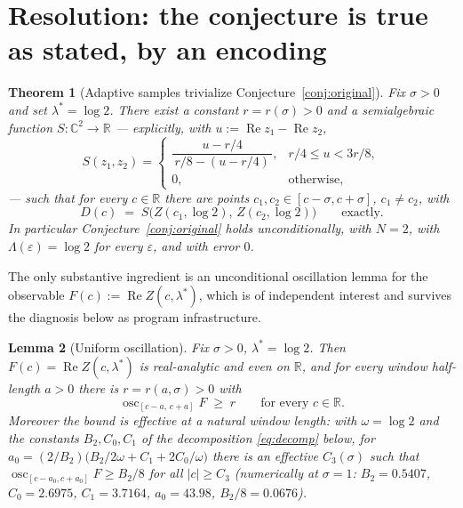 \documentclass[11pt]{amsart}
\theoremstyle{plain}
\newtheorem{theorem}{Theorem}[section]
\newtheorem{lemma}[theorem]{Lemma}
\theoremstyle{definition}
\theoremstyle{remark}
\newcommand{\CC}{\mathbb{C}}
\newcommand{\RR}{\mathbb{R}}
\newcommand{\re}{\operatorname{Re}}
\DeclareMathOperator{\osc}{osc}
\begin{document}
\section{Resolution: the conjecture is true as stated, by an encoding}\label{sec:resolution}

\begin{theorem}[Adaptive samples trivialize Conjecture~\ref{conj:original}]\label{thm:encoding}
Fix $\sigma>0$ and set $\lambda^*=\log2$. There exist a constant $r=r(\sigma)>0$ and a
semialgebraic function $S:\CC^2\to\RR$ --- explicitly, with $u:=\re z_1-\re z_2$,
\[
S(z_1,z_2)=
\begin{cases}
\dfrac{u-r/4}{\,r/8-(u-r/4)\,}, & r/4\le u<3r/8,\\[4pt]
0,&\text{otherwise},
\end{cases}
\]
--- such that for every $c\in\RR$ there are points $c_1,c_2\in[c-\sigma,c+\sigma]$, $c_1\ne c_2$,
with
\[
D(c)\;=\;S\bigl(Z(c_1,\log2),\,Z(c_2,\log2)\bigr)\qquad\text{exactly}.
\]
In particular Conjecture~\ref{conj:original} holds unconditionally, with $N=2$, with
$\Lambda(\varepsilon)=\log2$ for every $\varepsilon$, and with error $0$.
\end{theorem}

The only substantive ingredient is an unconditional oscillation lemma for the observable
$F(c):=\re Z(c,\lambda^*)$, which is of independent interest and survives the diagnosis below as
program infrastructure.

\begin{lemma}[Uniform oscillation]\label{lem:osc}
Fix $\sigma>0$, $\lambda^*=\log2$. Then $F(c)=\re Z(c,\lambda^*)$ is real-analytic and even on
$\RR$, and for every window half-length $a>0$ there is $r=r(a,\sigma)>0$ with
\[
\osc_{[c-a,\,c+a]}F\;\ge\;r\qquad\text{for every }c\in\RR .
\]
Moreover the bound is effective at a natural window length: with $\omega=\log2$ and the constants
$B_2,C_0,C_1$ of the decomposition \eqref{eq:decomp} below, for
$a_0=(2/B_2)\bigl(B_2/2\omega+C_1+2C_0/\omega\bigr)$ there is an effective $C_3(\sigma)$ such that
$\osc_{[c-a_0,c+a_0]}F\ge B_2/8$ for all $|c|\ge C_3$ (numerically at $\sigma=1$:
$B_2=0.5407$, $C_0=2.6975$, $C_1=3.7164$, $a_0=43.98$, $B_2/8=0.0676$).
\end{lemma}
\end{document}
